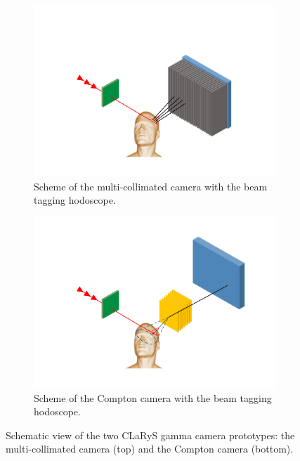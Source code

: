 \begin{figure}
\begin{subfigure}[b]{.5\textwidth}
\centering
\includegraphics[width=1.2\textwidth]{03_GraphicFiles/chapter3_CLaRySproto/schemes/schema_Collimated_withHodo.pdf}
\caption{Scheme of the multi-collimated camera with the beam tagging hodoscope.}
\label{chap3::subfig::multiCollScheme}
\end{subfigure}
\begin{subfigure}[b]{.5\textwidth}
\centering
\includegraphics[width=1.2\textwidth]{03_GraphicFiles/chapter3_CLaRySproto/schemes/schema_Compton_withHodo.pdf}	
\caption{Scheme of the Compton camera with the beam tagging hodoscope.}
\label{chap3::subfig::ComptonScheme}
\end{subfigure}
\caption{Schematic view of the two CLaRyS gamma camera prototypes: the multi-collimated camera (top) and the Compton camera (bottom).}
\label{chap3::fig::camerasScheme}
\end{figure}
 

